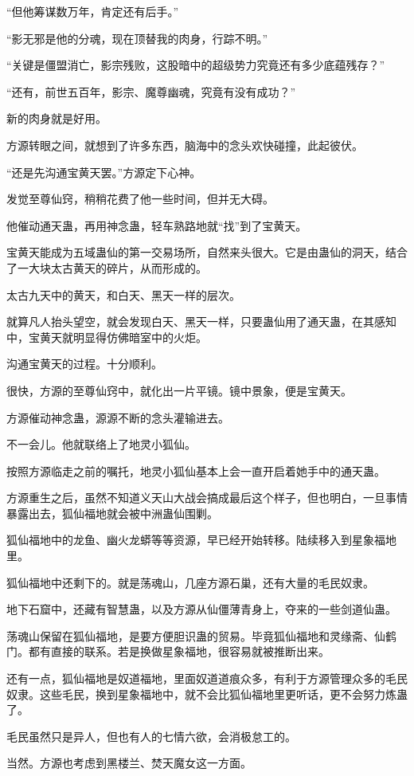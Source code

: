 \begin{this_body}
“但他筹谋数万年，肯定还有后手。”

“影无邪是他的分魂，现在顶替我的肉身，行踪不明。”

“关键是僵盟消亡，影宗残败，这股暗中的超级势力究竟还有多少底蕴残存？”

“还有，前世五百年，影宗、魔尊幽魂，究竟有没有成功？”

新的肉身就是好用。

方源转眼之间，就想到了许多东西，脑海中的念头欢快碰撞，此起彼伏。

“还是先沟通宝黄天罢。”方源定下心神。

发觉至尊仙窍，稍稍花费了他一些时间，但并无大碍。

他催动通天蛊，再用神念蛊，轻车熟路地就“找”到了宝黄天。

宝黄天能成为五域蛊仙的第一交易场所，自然来头很大。它是由蛊仙的洞天，结合了一大块太古黄天的碎片，从而形成的。

太古九天中的黄天，和白天、黑天一样的层次。

就算凡人抬头望空，就会发现白天、黑天一样，只要蛊仙用了通天蛊，在其感知中，宝黄天就明显得仿佛暗室中的火炬。

沟通宝黄天的过程。十分顺利。

很快，方源的至尊仙窍中，就化出一片平镜。镜中景象，便是宝黄天。

方源催动神念蛊，源源不断的念头灌输进去。

不一会儿。他就联络上了地灵小狐仙。

按照方源临走之前的嘱托，地灵小狐仙基本上会一直开启着她手中的通天蛊。

方源重生之后，虽然不知道义天山大战会搞成最后这个样子，但也明白，一旦事情暴露出去，狐仙福地就会被中洲蛊仙围剿。

狐仙福地中的龙鱼、幽火龙蟒等等资源，早已经开始转移。陆续移入到星象福地里。

狐仙福地中还剩下的。就是荡魂山，几座方源石巢，还有大量的毛民奴隶。

地下石窟中，还藏有智慧蛊，以及方源从仙僵薄青身上，夺来的一些剑道仙蛊。

荡魂山保留在狐仙福地，是要方便胆识蛊的贸易。毕竟狐仙福地和灵缘斋、仙鹤门。都有直接的联系。若是换做星象福地，很容易就被推断出来。

还有一点，狐仙福地是奴道福地，里面奴道道痕众多，有利于方源管理众多的毛民奴隶。这些毛民，换到星象福地中，就不会比狐仙福地里更听话，更不会努力炼蛊了。

毛民虽然只是异人，但也有人的七情六欲，会消极怠工的。

当然。方源也考虑到黑楼兰、焚天魔女这一方面。


\end{this_body}
